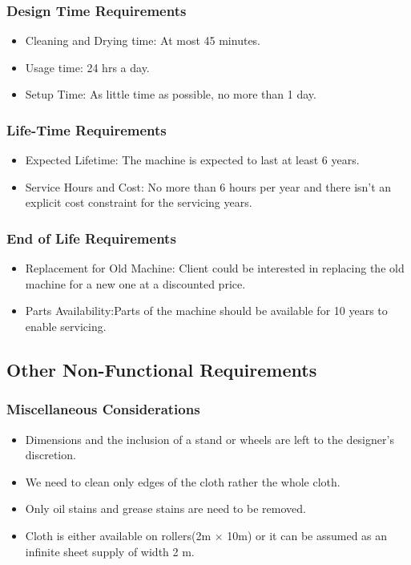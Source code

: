 \documentclass[table,french,english]{rapportCS}
\begin{document}
\subsubsection{Design Time Requirements}\label{sec: destimereq}
    \begin{itemize}[label=$\bullet$]
      \item Cleaning and Drying time: At most  45 minutes.
      \item Usage time: 24 hrs a day.
      \item Setup Time: As little time as possible, no more than 1 day.
    \end{itemize}
  
  \subsubsection{Life-Time Requirements}\label{sec: lifetimereq}
    \begin{itemize}[label=$\bullet$]
      \item Expected Lifetime: The machine is expected to last at least 6 years.
      \item Service Hours and Cost: No more than 6 hours per year and there isn’t an explicit cost constraint for the servicing years.
    \end{itemize}
  \subsubsection{End of Life Requirements}\label{sec: endoflifereq}
    \begin{itemize}[label=$\bullet$]
      \item Replacement for Old Machine: Client could be interested in replacing the old machine for a new one at a discounted price.
      \item Parts Availability:Parts of the machine should be available for 10 years to enable servicing.
    \end{itemize}

\subsection{Other Non-Functional Requirements}\label{sec:otherreq}
\subsubsection{Miscellaneous Considerations}\label{sec:misccons}
    \begin{itemize}[label=$\bullet$]
      \item Dimensions and the inclusion of a stand or wheels are left to the designer's discretion.
      \item We need to clean only edges of the cloth rather the whole cloth.
      \item Only oil stains and grease stains are need to be removed.
      \item Cloth is either available on rollers(2m $\times$ 10m) or it can be assumed as an infinite sheet supply of width 2 m.

    \end{itemize}
\newpage
\end{document}
